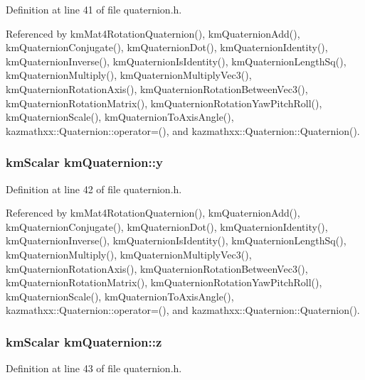 Definition at line 41 of file quaternion.h.

Referenced by kmMat4RotationQuaternion(), kmQuaternionAdd(), kmQuaternionConjugate(), kmQuaternionDot(), kmQuaternionIdentity(), kmQuaternionInverse(), kmQuaternionIsIdentity(), kmQuaternionLengthSq(), kmQuaternionMultiply(), kmQuaternionMultiplyVec3(), kmQuaternionRotationAxis(), kmQuaternionRotationBetweenVec3(), kmQuaternionRotationMatrix(), kmQuaternionRotationYawPitchRoll(), kmQuaternionScale(), kmQuaternionToAxisAngle(), kazmathxx::Quaternion::operator=(), and kazmathxx::Quaternion::Quaternion().\hypertarget{structkm_quaternion_6cb097db1a5e24c5e6d7a673dd9b5c68}{
\subsubsection[y]{\setlength{\rightskip}{0pt plus 5cm}kmScalar {\bf kmQuaternion::y}}}
\label{structkm_quaternion_6cb097db1a5e24c5e6d7a673dd9b5c68}




Definition at line 42 of file quaternion.h.

Referenced by kmMat4RotationQuaternion(), kmQuaternionAdd(), kmQuaternionConjugate(), kmQuaternionDot(), kmQuaternionIdentity(), kmQuaternionInverse(), kmQuaternionIsIdentity(), kmQuaternionLengthSq(), kmQuaternionMultiply(), kmQuaternionMultiplyVec3(), kmQuaternionRotationAxis(), kmQuaternionRotationBetweenVec3(), kmQuaternionRotationMatrix(), kmQuaternionRotationYawPitchRoll(), kmQuaternionScale(), kmQuaternionToAxisAngle(), kazmathxx::Quaternion::operator=(), and kazmathxx::Quaternion::Quaternion().\hypertarget{structkm_quaternion_63b2d2685be9e41190fdf45bf21e6690}{
\subsubsection[z]{\setlength{\rightskip}{0pt plus 5cm}kmScalar {\bf kmQuaternion::z}}}
\label{structkm_quaternion_63b2d2685be9e41190fdf45bf21e6690}




Definition at line 43 of file quaternion.h.

